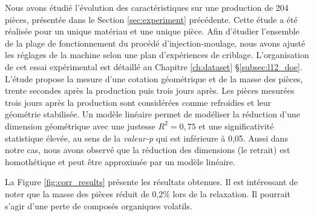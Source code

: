 Nous avons étudié l'évolution des caractéristiques sur une production de 204 pièces, présentée dans le Section \ref{sec:experiment} précédente.
Cette étude a été réalisée pour un unique matériau et une unique pièce.
Afin d'étudier l'ensemble de la plage de fonctionnement du procédé d'injection-moulage, nous avons ajusté les réglages de la machine selon une plan d'expériences de criblage.
L'organisation de cet essai expérimental est détaillé au Chapitre \ref{ch:dataset} §\ref{subsec:l12_doe}.
L'étude propose la mesure d'une cotation géométrique et de la masse des pièces, trente secondes après la production puis trois jours après.
Les pièces mesurées trois jours après la production sont considérées comme refroidies et leur géométrie stabilisée.
Un modèle linéaire permet de modéliser la réduction d'une dimension géométrique avec une justesse $R^2 = 0,75$ et une significativité statistique élevée, au sens de la \textit{valeur-p} qui est inférieure à 0,05.
Aussi dans notre cas, nous avons observé que la réduction des dimensions (le retrait) est homothétique et peut être approximée par un modèle linéaire.

La Figure \ref{fig:corr_results} présente les résultats obtenues.
Il est intéressant de noter que la masse des pièces réduit de 0,2\% lors de la relaxation.
Il pourrait s'agir d'une perte de composés organiques volatils.

